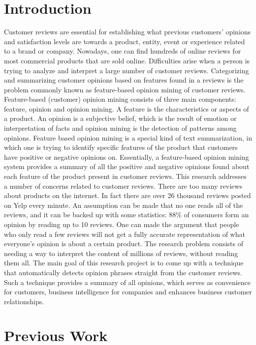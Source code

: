\documentclass{sig-alternate}
\begin{document}
\section{Introduction}
Customer reviews are essential for establishing what previous customers' opinions and satisfaction levels are towards a product, entity, event or experience related to a brand or company. Nowadays, one can find hundreds of online reviews for most commercial products that are sold online. Difficulties arise when a person is trying to analyze and interpret a large number of customer reviews. Categorizing and summarizing customer opinions based on features found in a reviews is the problem commonly known as feature-based opinion mining of customer reviews. 
Feature-based (customer) opinion mining consists of three main components: feature, opinion and opinion mining. A feature is the characteristics or aspects of a product. An opinion is a subjective belief, which is the result of emotion or interpretation of facts and opinion mining is the detection of patterns among opinions. Feature based opinion mining is a special kind of text summarization, in which one is trying to identify specific features of the product that customers have positive or negative opinions on. Essentially, a feature-based opinion mining system provides a summary of all the positive and negative opinions found about each feature of the product present in customer reviews.
This research addresses a number of concerns related to customer reviews. There are too many reviews about products on the internet. In fact there are over 26 thousand reviews posted on Yelp every minute\cite{Shrestha2016}. An assumption can be made that no one reads all of the reviews, and it can be  backed up with some statistics: 88\% of consumers form an opinion by reading up to 10 reviews\cite{Shrestha2016}. One can made the argument that people who only read a few reviews will not get a fully accurate representation of what everyone's opinion is about a certain product. The research problem consists of needing a way to interpret the content of millions of reviews, without reading them all. The main goal of this research project is to come up with a technique that automatically detects opinion phrases straight from the customer reviews. Such a technique provides a summary of all opinions, which serves as convenience for customers, business intelligence for companies and enhances business customer relationships.

\section{Previous Work}
\end{document}
